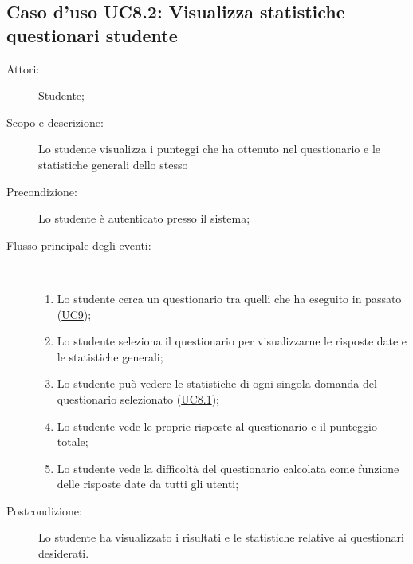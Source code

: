 \subsection{Caso d'uso UC8.2: Visualizza statistiche questionari studente}\begin{description}
	\item[Attori:] Studente;
	\item[Scopo e descrizione:] Lo studente visualizza i punteggi che ha ottenuto nel questionario e le statistiche generali dello stesso
	\item[Precondizione:] Lo studente è autenticato presso il sistema;
	
	\item[Flusso principale degli eventi:] \ 
	\begin{enumerate}
		\item Lo studente cerca un questionario tra quelli che ha eseguito in passato (\hyperlink{UC9}{UC9});
		\item Lo studente seleziona il questionario per visualizzarne le risposte date e le statistiche generali;
		\item Lo studente può vedere le statistiche di ogni singola domanda del questionario selezionato (\hyperlink{UC8.1}{UC8.1});
		\item Lo studente vede le proprie risposte al questionario e il punteggio totale;
		\item Lo studente vede la difficoltà del questionario calcolata come funzione delle risposte date da tutti gli utenti;
		
	\end{enumerate}
	\item[Postcondizione:] Lo studente ha visualizzato i risultati e le statistiche relative ai questionari desiderati.
\end{description}
\hypertarget{UC8.3}{}
